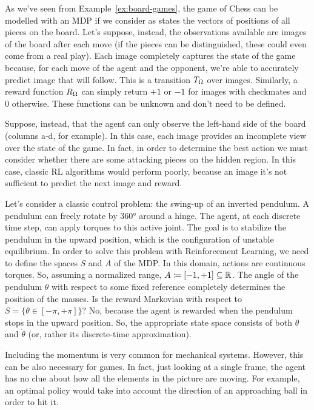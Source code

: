 \begin{example}
	As we've seen from Example~\vref{ex:board-games}, the game of Chess can
	be modelled with an MDP if we consider as states the vectors of positions of
	all pieces on the board. Let's suppose, instead, the observations available
	are images of the board after each move (if the pieces can be distinguished,
	these could even come from a real play). Each image completely captures the
	state of the game because, for each move of the agent and the opponent,
	we're able to accurately predict image that will follow. This is a
	transition $T_\Omega$ over images. Similarly, a reward function $R_\Omega$ can
	simply return $+1$ or $-1$ for images with checkmates and 0 otherwise. These
	functions can be unknown and don't need to be defined.

	Suppose, instead, that the agent can only observe the left-hand side of the
	board (columns a-d, for example). In this case, each image provides an
	incomplete view over the state of the game. In fact, in order to determine
	the best action we must consider whether there are some attacking pieces on
	the hidden region. In this case, classic RL algorithms would perform poorly,
	because an image it's not sufficient to predict the next image and reward.
\end{example}

\begin{example}
	Let's consider a classic control problem: the swing-up of an inverted
	pendulum. A pendulum can freely rotate by 360° around a hinge. The agent, at
	each discrete time step, can apply torques to this active joint.  The goal
	is to stabilize the pendulum in the upward position, which is the
	configuration of unstable equilibrium. In order to solve this problem with
	Reinforcement Learning, we need to define the spaces $S$ and $A$ of the MDP.
	In this domain, actions are continuous torques. So, assuming a normalized
	range, $A \coloneqq [-1, +1] \subseteq \mathbb{R}$. The angle of the pendulum
	$\theta$ with respect to some fixed reference completely determines the
	position of the masses. Is the reward Markovian with respect to $S =
	\{\theta \in [-\pi, +\pi]\}$? No, because the agent is rewarded when the
	pendulum stops in the upward position. So, the appropriate state space
	consists of both $\theta$ and $\dot\theta$ (or, rather its discrete-time
	approximation).

	Including the momentum is very common for mechanical systems. However, this
	can be also necessary for games. In fact, just looking at a single frame,
	the agent has no clue about how all the elements in the picture are moving.
	For example, an optimal policy would take into account the direction of an
	approaching ball in order to hit it.
\end{example}


